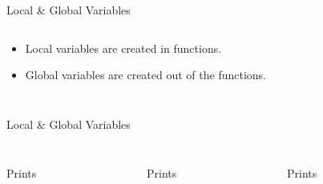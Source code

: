        \begin{frame}{Local \& Global Variables}
            \begin{columns}
                \begin{column}{0.50\textwidth}
                    \begin{itemize}
                        \item Local variables are created in functions.
                        \item Global variables are created out of the functions.
                    \end{itemize}
                    \inputminted[frame=single,framesep=2pt, lastline=15]{python3}{code-examples/var.py}
                \end{column}
                \begin{column}{0.50\textwidth}
                    \inputminted[frame=single,framesep=2pt, lastline=15]{python3}{code-examples/var2.py}                    
                    \inputminted[frame=single,framesep=2pt, lastline=15]{python3}{code-examples/var3.py}                    
                \end{column}
            \end{columns}
        \end{frame}

        \begin{frame}{Local \& Global Variables}
            \begin{columns}
                \begin{column}{0.33\textwidth}
                    \inputminted[frame=single,framesep=2pt, lastline=15]{python3}{code-examples/var4.py}                    
                    Prints
                \end{column}
                \begin{column}{0.33\textwidth}
                    \inputminted[frame=single,framesep=2pt, lastline=15]{python3}{code-examples/var5.py}                    
                    Prints
                \end{column}
                \begin{column}{0.33\textwidth}
                    \inputminted[frame=single,framesep=2pt, lastline=15]{python3}{code-examples/var6.py}                    
                    Prints
                \end{column}
            \end{columns}
        \end{frame}

